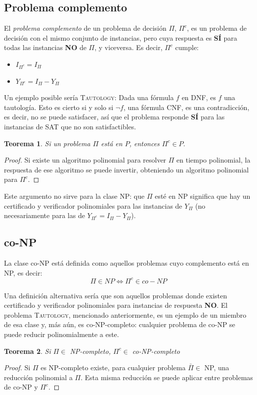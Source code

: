 \documentclass[a4paper]{report}
\newtheorem*{theorem*}{Teorema}
\begin{document}
\subsection{Problema complemento}

El \textit{problema complemento} de un problema de decisión $\Pi$, $\Pi^c$, es un problema de decisión con el mismo conjunto de instancias, pero cuya respuesta es \textbf{SÍ} para todas las instancias \textbf{NO} de $\Pi$, y viceversa. Es decir, $\Pi^c$ cumple:
\begin{itemize}
    \item $I_{\Pi^c} = I_{\Pi}$
    \item $Y_{\Pi^c} = I_{\Pi} - Y_{\Pi}$
\end{itemize}

Un ejemplo posible sería \textsc{Tautology}: Dada una fórmula $f$ en DNF, es $f$ una tautología. Esto es cierto si y solo si $\neg f$, una fórmula CNF, es una contradicción, es decir, no se puede satisfacer, así que el problema responde \textbf{SÍ} para las instancias de \textsc{SAT} que no son satisfactibles.

\begin{theorem*}
    Si un problema $\Pi$ está en $P$, entonces $\Pi^c \in P$.
\end{theorem*}
\begin{proof}
    Si existe un algoritmo polinomial para resolver $\Pi$ en tiempo polinomial, la respuesta de ese algoritmo se puede invertir, obteniendo un algoritmo polinomial para $\Pi^c$.
\end{proof}

Este argumento no sirve para la clase NP: que $\Pi$ esté en NP significa que hay un certificado y verificador polinomiales para las instancias de $Y_{\Pi}$ (no necesariamente para las de $Y_{\Pi^c} = I_{\Pi} - Y_{\Pi}$).

\subsection{co-NP}

La clase co-NP está definida como aquellos problemas cuyo complemento está en NP, es decir:
$$\Pi \in NP \iff \Pi^c \in co-NP$$

Una definición alternativa sería que son aquellos problemas donde existen certificado y verificador polinomiales para instancias de respuesta \textbf{NO}. El problema \textsc{Tautology}, mencionado anteriormente, es un ejemplo de un miembro de esa clase y, más aún, es co-NP-completo: cualquier problema de co-NP se puede reducir polinomialmente a este.

\begin{theorem*}
    Si $\Pi \in$ NP-completo, $\Pi^c \in$ co-NP-completo
\end{theorem*}
\begin{proof}
    Si $\Pi$ es NP-completo existe, para cualquier problema $\bar{\Pi} \in$ NP, una reducción polinomial a $\Pi$. Esta misma reducción se puede aplicar entre problemas de co-NP y $\Pi^c$.
\end{proof}
\end{document}
